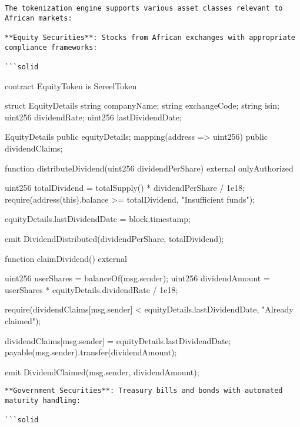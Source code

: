 \documentclass[12pt]{article}
\begin{document}
\begin{lstlisting}
The tokenization engine supports various asset classes relevant to African markets:

**Equity Securities**: Stocks from African exchanges with appropriate compliance frameworks:

```solid
\end{lstlisting}
contract EquityToken is SereelToken {    struct EquityDetails {        string companyName;        string exchangeCode;        string isin;        uint256 dividendRate;        uint256 lastDividendDate;    }

    EquityDetails public equityDetails;    mapping(address => uint256) public dividendClaims;

    function distributeDividend(uint256 dividendPerShare) external onlyAuthorized {        uint256 totalDividend = totalSupply() * dividendPerShare / 1e18;        require(address(this).balance >= totalDividend, "Insufficient funds");

        equityDetails.lastDividendDate = block.timestamp;

        emit DividendDistributed(dividendPerShare, totalDividend);    }

    function claimDividend() external {        uint256 userShares = balanceOf(msg.sender);        uint256 dividendAmount = userShares * equityDetails.dividendRate / 1e18;

        require(dividendClaims[msg.sender] < equityDetails.lastDividendDate, "Already claimed");

        dividendClaims[msg.sender] = equityDetails.lastDividendDate;        payable(msg.sender).transfer(dividendAmount);

        emit DividendClaimed(msg.sender, dividendAmount);    }}
\begin{lstlisting}
**Government Securities**: Treasury bills and bonds with automated maturity handling:

```solid
\end{lstlisting}
\end{document}
